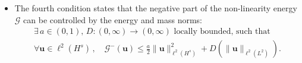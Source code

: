 \documentclass[12pt,a4paper]{amsart}
\makeatletter
\newcommand{\namedlabel}[2]{%
	\phantomsection%
	#1\def\@currentlabel{#1}\label{#2}%
}
\numberwithin{equation}{section}
\newcommand{\ulu}{\boldsymbol{u}}
\newcommand{\ulv}{\boldsymbol{v}}
\newcommand{\ulg}{\boldsymbol{g}}
\newcommand*\diff{\mathop{}\!\mathrm{d}}
\makeatother
\begin{document}
\begin{itemize}
		\begin{align}
			\exists\, \mathscr{G} & : \ell^2(L^2\cap L^{\nu}) \to \mathbb{R} \text{ such that } \forall \ulu,\ulv \in \ell^2(L^2\cap L^{\nu})\,, \nonumber \\
			\frac{\diff}{\diff \tau}\mathscr{G}(\ulu+\tau \ulv) \Big|_{\tau=0} 
			&= \langle \ulg (\ulu), \ulv \rangle_{ \ell^2(L^2+L^{\nu'}),\ell^2(L^2\cap L^{\nu})}+\langle  \ulv,\ulg (\ulu) \rangle_{\ell^2(L^2\cap L^{\nu}), \ell^2(L^2+L^{\nu'})} \nonumber\\
			&=\vcentcolon \mathrm{Re}\langle \ulg (\ulu), \ulv \rangle_{ \ell^2(L^2+L^{\nu'}),\ell^2(L^2\cap L^{\nu})}\,; %
		\end{align}
		\item[\namedlabel{(N4)}{ass4:nonlinearity_global_estimate}] The fourth condition states that the negative part of the non-linearity energy $\mathscr{G}$ can be controlled by the energy and mass norms:
		\begin{align}
			\exists \, a\in(0,1),\, D:(0,\infty)\to(0,\infty) \text{ locally bounded, such that } \\
			\forall \ulu \in \ell^2(H^s)\,,\quad 
			\mathscr{G}^{-}(\ulu) \leq \frac{a}{2} \| \ulu \|_{\ell^2(H^s)}^2 + D( \| \ulu \|_{\ell^2(L^2)}) .
		\end{align}
	\end{itemize}
	
\end{document}
